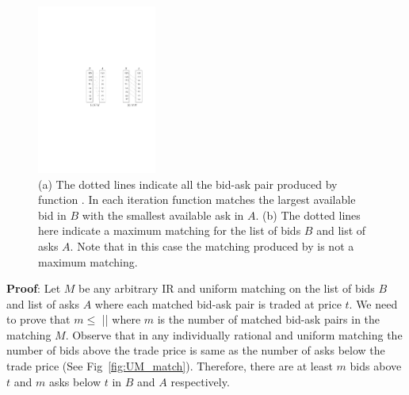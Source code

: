 \documentclass[a4paper,UKenglish,cleveref, autoref]{lipics-v2019}
\begin{document}
\begin{figure}[h!]
\centering
\includegraphics[width=0.35\textwidth]{UM.pdf}
\caption{(a) The dotted lines indicate all the bid-ask pair  produced by function . In each iteration function   matches the largest available bid in $B$ with the smallest available ask in $A$.  (b) The dotted lines here indicate a maximum matching for the list of bids $B$ and list of asks $A$. Note that in this case the matching produced by  is not a maximum matching. }
\label{fig:UM}
\end{figure}

\textbf{Proof}: Let $M$ be any arbitrary IR and uniform matching on the list of bids $B$ and list of asks $A$ where each matched bid-ask pair is traded at price $t$. We need to prove that $m \leq$ || where $m$ is the number of matched bid-ask pairs in the matching $M$. Observe that in any individually rational and uniform matching the number of bids above  the trade price is same as the number of asks below the trade price (See Fig~\ref{fig:UM_match}). Therefore, there are at least $m$ bids above $t$ and $m$ asks below $t$ in $B$ and $A$ respectively. 
\end{document}
